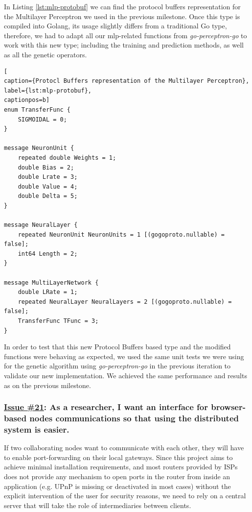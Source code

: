 In Listing \ref{lst:mlp-protobuf} we can find the protocol buffers representation for the Multilayer Perceptron we used in the previous milestone. Once this type is compiled into Golang, its usage slightly differs from a traditional Go type, therefore, we had to adapt all our mlp-related functions from \textit{go-perceptron-go} to work with this new type; including the training and prediction methods, as well as all the genetic operators.

\begin{lstlisting}[
caption={Protocl Buffers representation of the Multilayer Perceptron},
label={lst:mlp-protobuf},
captionpos=b]
enum TransferFunc {
    SIGMOIDAL = 0;
}

message NeuronUnit {
    repeated double Weights = 1;
    double Bias = 2;
    double Lrate = 3;
    double Value = 4;
    double Delta = 5;
}

message NeuralLayer {
    repeated NeuronUnit NeuronUnits = 1 [(gogoproto.nullable) = false];
    int64 Length = 2;
}

message MultiLayerNetwork {
    double LRate = 1;
    repeated NeuralLayer NeuralLayers = 2 [(gogoproto.nullable) = false];
    TransferFunc TFunc = 3;
}
\end{lstlisting} 

In order to test that this new Protocol Buffers based type and the modified functions were behaving as expected, we used the same unit tests we were using for the genetic algorithm using \textit{go-perceptron-go} in the previous iteration to validate our new implementation. We achieved the same performance and results as on the previous milestone.

\subsubsection*{\href{https://github.com/salvacorts/TFG-Parasitic-Metaheuristics/issues/21}{Issue \#21}: As a researcher, I want an interface for browser-based nodes communications so that using the distributed system is easier.}

If two collaborating nodes want to communicate with each other, they will have to enable port-forwarding on their local gateways. Since this project aims to achieve minimal installation requirements, and most routers provided by ISPs does not provide any mechanism to open ports in the router from inside an application (e.g. UPnP \cite{wiki-upnp} is missing or deactivated in most cases) without the explicit intervention of the user for security reasons, we need to rely on a central server that will take the role of intermediaries between clients.


